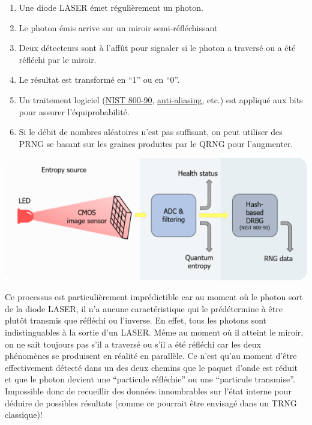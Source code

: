 \documentclass{scrartcl}
\begin{document}
\begin{enumerate}
\item Une diode LASER émet régulièrement un photon.
\item Le photon émis arrive sur un miroir semi-réfléchissant
\item Deux détecteurs sont à l'affût pour signaler si le photon a traversé ou a été réfléchi par le miroir.
\item Le résultat est transformé en “1” ou en “0”.
\item Un traitement logiciel (\href{https://nvlpubs.nist.gov/nistpubs/Legacy/SP/nistspecialpublication800-90r.pdf}{NIST 800-90}, \href{https://content.iospress.com/download/computability/com001?id=computability\%2Fcom001}{anti-aliasing}, etc.) est appliqué aux bits pour assurer l’équiprobabilité.
\item Si le débit de nombres aléatoires n’est pas suffisant, on peut utiliser des PRNG se basant sur les graines produites par le QRNG pour l’augmenter.
\end{enumerate}
\begin{center}
  \includegraphics[scale=0.5]{img/QRNG-core-technology-600x242.png}  
\end{center}

Ce processus est particulièrement imprédictible car au moment où le photon sort de la diode LASER, il n’a aucune caractéristique qui le prédétermine à être plutôt transmis que réfléchi ou l’inverse. En effet, tous les photons sont indistinguables à la sortie d'un LASER. Même au moment où il atteint le miroir, on ne sait toujours pas s’il a traversé ou s’il a été réfléchi car les deux phénomènes se produisent en réalité en parallèle. Ce n’est qu’au moment d’être effectivement détecté dans un des deux chemins que le paquet d’onde est réduit et que le photon devient une “particule réfléchie” ou une “particule transmise”. Impossible donc de recueillir des données innombrables sur l’état interne pour déduire de possibles résultats (comme ce pourrait être envisagé dans un TRNG classique)!
\end{document}
